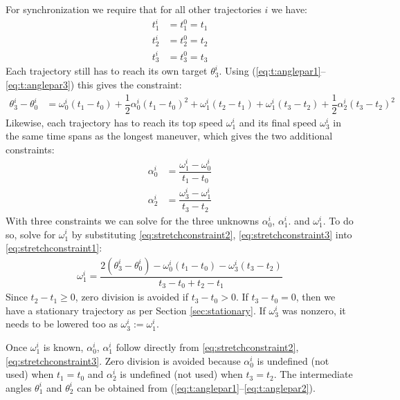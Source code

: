 \documentclass[12pt, a4paper]
{article}
\providecommand{\lr}[1]{\left(#1\right)}
\providecommand{\w}{\omega}
\renewcommand{\th}{\theta}
\renewcommand{\a}{\alpha}
\providecommand{\w}{\omega}
\begin{document}
For synchronization we require that for all other trajectories $i$ we have:
%
\begin{align}
    t^i_1 &= t^0_1=t_1\\[1em]
    t^i_2 &= t^0_2=t_2\\[1em]
    t^i_3 &= t^0_3=t_3
\end{align}
%
Each trajectory still has to reach its own target $\th^i_3$.
Using (\ref{eq:t:anglepar1}--\ref{eq:t:anglepar3}) this gives the constraint:
%
\begin{align}
    \label{eq:stretchconstraint1}
    \th^i_3 - \th^i_0  &=  \w^i_0(t_1-t_0)+\dfrac{1}{2}\a^i_0(t_1-t_0)^2+
        \w^i_1(t_2-t_1)+ \w^i_1(t_3-t_2)+\dfrac{1}{2}\a^i_2(t_3-t_2)^2    
\end{align}
%
Likewise, each trajectory has to reach its top speed $\w^i_1$ and its final
speed $\w^i_3$ in the same time spans as the longest maneuver, which gives the
two additional constraints:
%
\begin{align}
    \label{eq:stretchconstraint2}
    \a^i_0 &= \dfrac{\w^i_1-\w_0^i}{t_1 - t_0}\\[1em]
    \label{eq:stretchconstraint3}
    \a_2^i &= \dfrac{\w_3^i-\w_1^i}{t_3 - t_2}
\end{align}
%
With three constraints we can solve for the three unknowns $\a^i_0$, $\a^i_1$.
and $\w^i_1$. To do so, solve for $\w^i_1$ by substituting
\eqref{eq:stretchconstraint2}, \eqref{eq:stretchconstraint3} into
\eqref{eq:stretchconstraint1}:
%
\begin{align}
    \label{eq:stretchconstraintsolved}
    \w^i_1 = \dfrac{2\lr{\th_3^i-\th_0^i}-\w_0^i\lr{t_1-t_0} -
    \w_3^i\lr{t_3-t_2}}{t_3-t_0 + t_2 - t_1}
\end{align}
%
Since $t_2 - t_1 \geq 0$, zero division is avoided if $t_3 - t_0 > 0$. If $t_3
- t_0 = 0$, then we have a stationary trajectory as per Section
\ref{sec:stationary}. If $\w_3^i$ was nonzero, it needs to be lowered
too as $\w_3^i := \w_1^i$.

Once $\w^i_1$ is known, $\a^i_0$, $\a^i_1$ follow directly from
\eqref{eq:stretchconstraint2}, \eqref{eq:stretchconstraint3}. Zero division is
avoided because $\a^i_0$ is undefined (not used) when $t_1 = t_0$ and $\a^i_2$
is undefined (not used) when $t_3 = t_2$. The intermediate angles $\th_1^i$
and $\th_2^i$ can be obtained from
(\ref{eq:t:anglepar1}--\ref{eq:t:anglepar2}).
\end{document}
